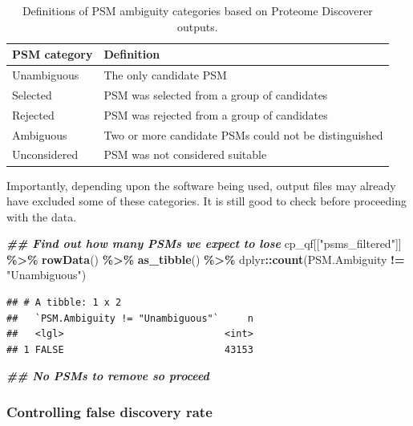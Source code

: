 \documentclass[9pt,a4paper,]{extarticle}
\newenvironment{Shaded}{\begin{snugshade}}{\end{snugshade}}
\newcommand{\DocumentationTok}[1]{\textcolor[rgb]{0.56,0.35,0.01}{\textbf{\textit{#1}}}}
\newcommand{\FunctionTok}[1]{\textcolor[rgb]{0.13,0.29,0.53}{\textbf{#1}}}
\newcommand{\NormalTok}[1]{#1}
\newcommand{\SpecialCharTok}[1]{\textcolor[rgb]{0.81,0.36,0.00}{\textbf{#1}}}
\newcommand{\StringTok}[1]{\textcolor[rgb]{0.31,0.60,0.02}{#1}}
\begin{document}
\begin{table}

\caption{\label{tab:table3}Definitions of PSM ambiguity categories based on Proteome Discoverer outputs.}
\centering
\begin{tabular}[t]{l|l}
\hline
PSM category & Definition\\
\hline
Unambiguous & The only candidate PSM\\
\hline
Selected & PSM was selected from a group of candidates\\
\hline
Rejected & PSM was rejected from a group of candidates\\
\hline
Ambiguous & Two or more candidate PSMs could not be distinguished\\
\hline
Unconsidered & PSM was not considered suitable\\
\hline
\end{tabular}
\end{table}

Importantly, depending upon the software being used, output files may already
have excluded some of these categories. It is still good to check before
proceeding with the data.

\begin{Shaded}
\begin{Highlighting}[]
\DocumentationTok{\#\# Find out how many PSMs we expect to lose}
\NormalTok{cp\_qf[[}\StringTok{"psms\_filtered"}\NormalTok{]] }\SpecialCharTok{\%\textgreater{}\%} 
  \FunctionTok{rowData}\NormalTok{() }\SpecialCharTok{\%\textgreater{}\%} 
  \FunctionTok{as\_tibble}\NormalTok{() }\SpecialCharTok{\%\textgreater{}\%} 
\NormalTok{  dplyr}\SpecialCharTok{::}\FunctionTok{count}\NormalTok{(PSM.Ambiguity }\SpecialCharTok{!=} \StringTok{"Unambiguous"}\NormalTok{)}
\end{Highlighting}
\end{Shaded}

\begin{verbatim}
## # A tibble: 1 x 2
##   `PSM.Ambiguity != "Unambiguous"`     n
##   <lgl>                            <int>
## 1 FALSE                            43153
\end{verbatim}

\begin{Shaded}
\begin{Highlighting}[]
\DocumentationTok{\#\# No PSMs to remove so proceed}
\end{Highlighting}
\end{Shaded}

\subsubsection{Controlling false discovery rate}\label{controlling-false-discovery-rate}
\end{document}
